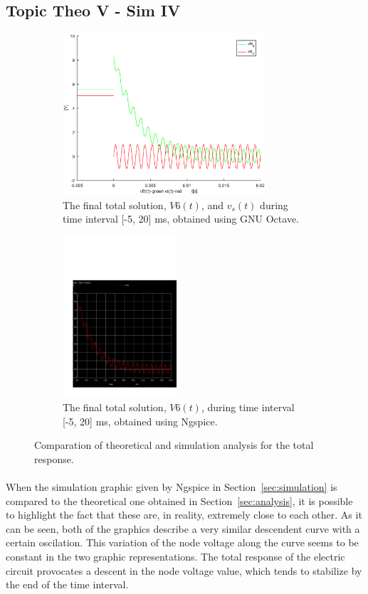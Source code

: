 \subsection{Topic Theo V - Sim IV}
\label{subsec:fourth_topic_error}

\begin{figure}[H]

\begin{subfigure}{0.5\textwidth}
\includegraphics[width=0.9\linewidth, height=6cm]{total.eps} 
\caption{The final total solution, $V6(t)$,  and $v_s(t)$ during time interval [-5, 20] ms, obtained using GNU Octave.}
\label{fig:theo_fifth}
\end{subfigure}
\begin{subfigure}{0.5\textwidth}
\includegraphics[width=0.9\linewidth, height=6cm]{trans2.pdf}
\caption{The final total solution, $V6(t)$, during time interval [-5, 20] ms, obtained using Ngspice.}
\label{fig:total}
\end{subfigure}

\caption{Comparation of theoretical and simulation analysis for the total response.}
\label{fig:compar_2}
\end{figure}

\paragraph{}
When the simulation graphic given by Ngspice in Section~\ref{sec:simulation} is compared to the theoretical one obtained in Section~\ref{sec:analysis}, it is possible to highlight the fact that these are, in reality, extremely close to each other. As it can be seen, both of the graphics describe a very similar descendent curve with a certain oscilation. This variation of the node voltage along the curve seems to be constant in the two graphic representations. The total response of the electric circuit provocates a descent in the node voltage value, which tends to stabilize by the end of the time interval.


